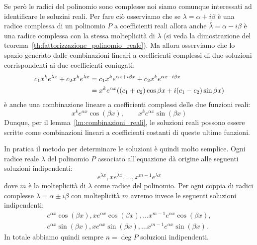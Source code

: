 Se però le radici del polinomio sono complesse noi siamo comunque interessati ad identificare 
le soluzini reali.
Per fare ciò osserviamo che se $\lambda = \alpha + i \beta $ è una radice complessa di un polinomio $P$ a coefficienti 
reali allora anche $\bar \lambda =\alpha - i \beta$ è una radice complessa con la stessa molteplicità di $\lambda$
(si veda la dimostrazione del teorema~\ref{th:fattorizzazione_polinomio_reale}). 
Ma allora osserviamo che lo spazio generato dalle combinazioni lineari a coefficienti complessi
di due soluzioni corrispondenti ai due coefficienti coniugati:
\begin{align*}
  c_1 x^k e^{\lambda x} + c_2  x^k e^{\bar\lambda x}
  &= c_1 x^k e^{\alpha x+i \beta x} + c_2 x^k e^{\alpha x - i \beta x}\\
  &= x^k e^{\alpha x}{\left( (c_1+c_2) \cos \beta x + i (c_1-c_2) \sin \beta x \right)}
\end{align*}
è anche una combinazione lineare a coefficienti complessi delle due funzioni reali:
\begin{equation}\label{eq:489571798}
  x^k e^{\alpha x} \cos(\beta x), \qquad
  x^k e^{\alpha x} \sin(\beta x)
\end{equation}
Dunque, per il lemma~\ref{lm:combinazioni_reali}, 
le soluzioni reali possono essere scritte come combinazioni lineari a coefficienti 
costanti di queste ultime funzioni.

In pratica il metodo per determinare le soluzioni è quindi molto semplice. 
Ogni radice reale $\lambda$ del polinomio $P$ associato all'equazione dà origine 
alle seguenti soluzioni indipendenti:
\[
  e^{\lambda x}, x e^{\lambda x}, \dots, x^{m-1} e^{\lambda x}
\]
dove $m$ è la molteplicità di $\lambda$ come radice del polinomio.
Per ogni coppia di radici complesse $\lambda = \alpha \pm i \beta$ con molteplicità $m$ 
avremo invece le seguenti soluzioni indipendenti:
\begin{gather*}
  e^{\alpha x}\cos(\beta x), x e^{\alpha x}\cos(\beta x), \dots x^{m-1} e^{\alpha x}\cos(\beta x),\\
  e^{\alpha x}\sin(\beta x), x e^{\alpha x}\sin(\beta x), \dots x^{m-1} e^{\alpha x}\sin(\beta x).
\end{gather*}
In totale abbiamo quindi sempre $n=\deg P$ soluzioni indipendenti.

